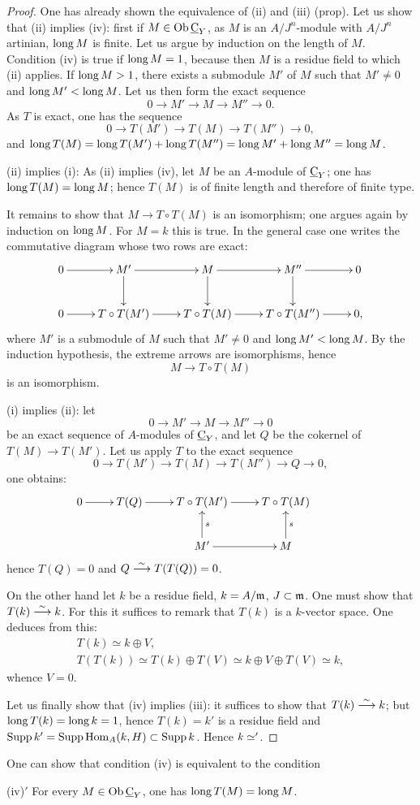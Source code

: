 \begin{proof}
One has already shown the equivalence of (ii) and (iii) (prop\ptbl {}). Let us show that (ii) implies (iv): first if $M\in \operatorname{Ob} \underline{\mathrm{C}}_{Y}$, as $M$ is an $A/J^{n}$-module with $A/J^{n}$ artinian, $\operatorname{long} M$ is finite. Let us argue by induction on the length of $M$. Condition (iv) is true if $\operatorname{long} M=1$, because then $M$ is a residue field to which (ii) applies. If $\operatorname{long} M>1$, there exists a submodule $M'$ of $M$ such that $M'\neq 0$ and $\operatorname{long} M'<\operatorname{long} M$. Let us then form the exact sequence
$$
0\to M'\to M\to M''\to 0.
$$
As $T$ is exact, one has the sequence
$$
0\to T(M')\to T(M)\to T(M'')\to 0,
$$
and $\operatorname{long} T(M)=\operatorname{long} T(M')+\operatorname{long} T(M'')=\operatorname{long} M'+\operatorname{long} M''=\operatorname{long} M$.

(ii) implies (i): As (ii) implies (iv), let $M$ be an $A$-module of $\underline{\mathrm{C}}_{Y}$; one has $\operatorname{long} T(M)=\operatorname{long} M$; hence $T(M)$ is of finite length and therefore of finite type.

It remains to show that $M\to T\circ T(M)$ is an isomorphism; one argues again by induction on $\operatorname{long} M$. For $M=k$ this is true. In the general case one writes the commutative diagram whose two rows are exact:
$$
\xymatrix{ 0\ar[r]&M'\ar[r]\ar[d]&M\ar[r]\ar[d]&M''\ar[r]\ar[d]&0\\
0\ar[r]& T\circ T(M')\ar[r]& T\circ T(M)\ar[r]& T\circ T(M'')\ar[r]&0, }
$$
where $M'$ is a submodule of $M$ such that $M'\neq 0$ and $\operatorname{long} M'<\operatorname{long} M$. By the induction hypothesis, the extreme arrows are isomorphisms, hence
$$
M\to T\circ T(M)
$$
is an isomorphism.

(i) implies (ii): let
$$
0\to M'\to M\to M''\to 0
$$
be an exact sequence of $A$-modules of $\underline{\mathrm{C}}_{Y}$, and let $Q$ be the cokernel of $T(M)\to T(M')$. Let us apply $T$ to the exact sequence
$$
0\to T(M')\to T(M)\to T(M'')\to Q \to 0,
$$
one obtains:
$$
\xymatrix{
0\ar[r]&T(Q)\ar[r]&T\circ T(M')\ar[r]&T\circ T(M)&\\
& &M'\ar_{s}[u]\ar[r]&M\ar_{s}[u],
}
$$
hence $T(Q)=0$ and $Q\overset{\sim}{\longrightarrow} T(T(Q))=0$.

On the other hand let $k$ be a residue field, $k=A/\mathfrak{m}$, $J\subset \mathfrak{m}$. One must show that $T(k)\overset{\sim}{\longrightarrow} k$. For this it suffices to remark that $T(k)$ is a $k$-vector space. One deduces from this:
\begin{gather*}
T(k)\simeq k\oplus V,\\
T(T(k))\simeq T(k)\oplus T(V)\simeq k\oplus V\oplus T(V)\simeq k,
\end{gather*}
whence $V=0$.

Let us finally show that (iv) implies (iii): it suffices to show that $T(k)\overset{\sim}{\longrightarrow} k$; but $\operatorname{long} T(k)= \operatorname{long} k=1$, hence $T(k)=k'$ is a residue field and $\operatorname{Supp} k'= \operatorname{Supp} \operatorname{Hom}_{A}(k, H)\subset \operatorname{Supp} k$. Hence $k\simeq'$.
\skipqed
\end{proof}

\begin{remark} \label{IV.3.2}
One can show that condition (iv) is equivalent to the condition

(iv)$'$ For every $M\in \operatorname{Ob} \underline{\mathrm{C}}_{Y}$, one has $\operatorname{long} T(M)=\operatorname{long} M$.
\end{remark}
